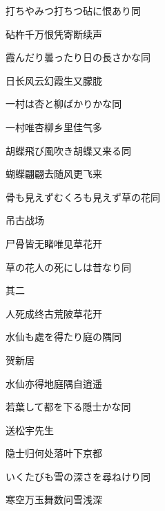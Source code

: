 \begin{haiku}
    {\FH 打ちやみつ打ちつ砧に恨あり}\hfill{\FH 同}

    {\FK 砧杵千万恨凭寄断续声}
\end{haiku}

\begin{haiku}
    {\FH 霞んだり曇ったり日の長さかな}\hfill{\FH 同}

    {\FK 日长风云幻霞生又朦胧}
\end{haiku}

\begin{haiku}
    {\FH 一村は杏と柳ばかりかな}\hfill{\FH 同}

    {\FK 一村唯杏柳乡里佳气多}
\end{haiku}

\begin{haiku}
    {\FH 胡蝶飛び風吹き胡蝶又来る}\hfill{\FH 同}

    {\FK 蝴蝶翩翩去随风更飞来}
\end{haiku}

\begin{haiku}
    {\FH 骨も見えずむくろも見えず草の花}\hfill{\FH 同}

    {\FK 吊古战场}

    {\FK 尸骨皆无睹唯见草花开}
\end{haiku}

\begin{haiku}
    {\FH 草の花人の死にしは昔なり}\hfill{\FH 同}

    {\FK 其二}

    {\FK 人死成终古荒陂草花开}
\end{haiku}

\begin{haiku}
    {\FH 水仙も處を得たり庭の隅}\hfill{\FH 同}

    {\FK 贺新居}

    {\FK 水仙亦得地庭隅自逍遥}
\end{haiku}

\begin{haiku}
    {\FH 若葉して都を下る隠士かな}\hfill{\FH 同}

    {\FK 送松宇先生}

    {\FK 隐士归何处落叶下京都}
\end{haiku}

\begin{haiku}
    {\FH いくたびも雪の深さを尋ねけり}\hfill{\FH 同}

    {\FK 寒空万玉舞数问雪浅深}
\end{haiku}

